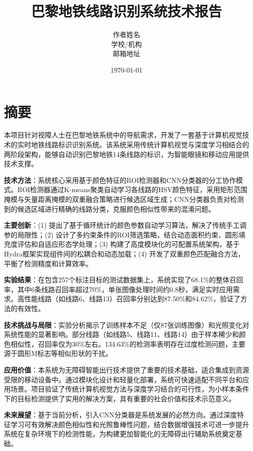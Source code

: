 \documentclass[12pt,a4paper]{article}
\title{\Huge \textbf{巴黎地铁线路识别系统技术报告}}
\author{
    \large 作者姓名\\
    \normalsize 学校/机构\\
    \normalsize 邮箱地址
}
\date{\today}
\begin{document}
\maketitle
\newpage

\tableofcontents
\newpage

\listoffigures
\newpage
\listoftables
\newpage


\section{摘要}

本项目针对视障人士在巴黎地铁系统中的导航需求，开发了一套基于计算机视觉技术的实时地铁线路标识识别系统。该系统采用传统计算机视觉与深度学习相结合的两阶段架构，能够自动识别巴黎地铁14条线路的标识，为智能眼镜和移动应用提供技术支撑。

\textbf{技术方法}：系统核心采用基于颜色特征的ROI检测器和CNN分类器的分工协作模式。ROI检测器通过K-means聚类自动学习各线路的HSV颜色特征，采用矩形范围掩模与矢量距离掩模的双重融合策略进行候选区域生成；CNN分类器负责对检测到的候选区域进行精确的线路分类，克服颜色相似性带来的混淆问题。

\textbf{主要创新}：(1) 提出了基于循环统计的颜色参数自动学习算法，解决了传统手工调参的局限性；(2) 设计了多约束条件的ROI筛选策略，结合动态面积约束、圆形填充度评估和自适应形态学处理；(3) 构建了高度模块化的可配置系统架构，基于Hydra框架实现组件间的松耦合和动态加载；(4) 开发了双重颜色匹配融合方法，平衡了检测精度和计算效率。

\textbf{实验结果}：在包含257个标注目标的测试数据集上，系统实现了68.1\%的整体召回率，其中6条线路召回率超过70\%，单张图像处理时间约0.8秒，满足实时应用需求。高性能线路（如线路6、线路13）召回率分别达到87.50\%和84.62\%，验证了方法的有效性。

\textbf{技术挑战与局限}：实验分析揭示了训练样本不足（仅87张训练图像）和光照变化对系统性能的显著影响。部分线路（如线路5、线路11、线路14）由于样本稀少和颜色相似性，召回率仅为30\%左右。134.63\%的检测率表明存在过度检测问题，主要源于圆形M标志等相似形状的干扰。

\textbf{应用价值}：本系统为无障碍智能出行技术提供了重要的技术基础，适合集成到资源受限的移动设备中。通过模块化设计和轻量化部署，系统可快速适配不同平台和应用场景。项目验证了传统计算机视觉方法与深度学习结合的可行性，为小样本条件下的目标检测提供了实用的解决方案，具有重要的社会价值和技术示范意义。

\textbf{未来展望}：基于当前分析，引入CNN分类器是系统发展的必然方向。通过深度特征学习可有效解决颜色相似性和光照鲁棒性问题，结合数据增强技术可进一步提升系统在复杂环境下的检测性能，为构建更加智能化的无障碍出行辅助系统奠定基础。
\end{document}
